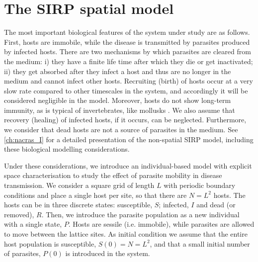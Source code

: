 
\section{The SIRP spatial model} \label{sec:model}

The most important biological features of the system under study are as
follows. First, hosts are immobile, while the disease is transmitted by
parasites produced by infected hosts. There are two mechanisms by which
parasites are cleared from the medium: i) they have a finite life time after
which they die or get inactivated; ii) they get absorbed after they infect a
host and thus are no
longer in the medium and cannot infect other hosts. Recruiting (birth) of hosts
occur at a very slow rate compared to other timescales in the system, and
accordingly it will be considered negligible in the model. Moreover, hosts do
not show long-term immunity, as is typical of invertebrates, like mollusks
\cite{Powell2015}. We also assume that recovery (healing) of infected hosts, if
it occurs, can be neglected. Furthermore, we consider that dead hosts are not a
source of parasites in the medium. See \cref{ch:nacras_I}
\cite{GimenezRomero2021} for a detailed
presentation of the non-spatial SIRP model, including these biological
modelling considerations.

Under these considerations, we introduce an individual-based model with
explicit space characterisation to study the effect of parasite mobility in
disease transmission. We consider a square grid of length $L$ with periodic
boundary conditions and place a single host per site, so that there are $N=L^2$
hosts. The hosts can be in three discrete states: susceptible, $S$; infected,
$I$ and dead (or removed), $R$. Then, we introduce the parasite population as a
new individual with a single state, $P$. Hosts are sessile (i.e. immobile),
while parasites are allowed to move between the lattice sites. As initial
condition we assume that the entire host population is susceptible,
$S(0)=N=L^2$, and that a small initial number of parasites, $P(0)$ is
introduced in the system.

